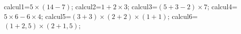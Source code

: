 \documentclass[exercice]{thedocument}%
\begin{document}
%
    \>calcul1=$5\times(14-7)$;%
    \>calcul2=$1+2\times3$;%
    \>calcul3=$(5+3-2)\times7$;%
    \>calcul4=$5\times6-6\times4$;%
    \>calcul5=$(3+3)\times(2+2)\times(1+1)$;%
    \>calcul6=$(1+2,5)\times(2+1,5)$;%
\end{document}
